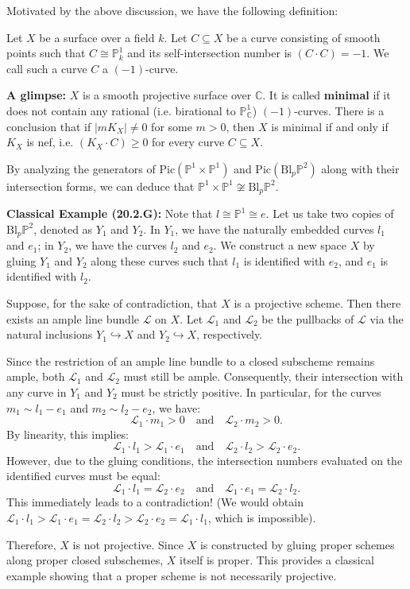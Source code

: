 Motivated by the above discussion, we have the following definition:

\begin{definition}[20.2.8]
Let $X$ be a surface over a field $k$. Let $C \subseteq X$ be a curve consisting of smooth points such that $C \cong \mathbb{P}^1_k$ and its self-intersection number is $(C \cdot C) = -1$. We call such a curve $C$ a $(-1)$-curve.
\end{definition}

\textbf{A glimpse:} $X$ is a smooth projective surface over $\mathbb{C}$. It is called \textbf{minimal} if it does not contain any rational (i.e. birational to $\mathbb{P}^1_{\mathbb{C}}$) $(-1)$-curves. 
There is a conclusion that if $|mK_X|\neq 0$ for some $m>0$, then $X$ is minimal if and only if $K_X$ is nef, i.e. $(K_X \cdot C) \geq 0$ for every curve $C \subseteq X$.

\begin{remark}
By analyzing the generators of $\mathrm{Pic}(\mathbb{P}^1 \times \mathbb{P}^1)$ and $\mathrm{Pic}(\mathrm{Bl}_p \mathbb{P}^2)$ along with their intersection forms, we can deduce that $\mathbb{P}^1 \times \mathbb{P}^1 \not\cong \mathrm{Bl}_p \mathbb{P}^2$.
\end{remark}



\textbf{Classical Example (20.2.G):}
Note that $l \cong \mathbb{P}^1 \cong e$. 
Let us take two copies of $\text{Bl}_p \mathbb{P}^2$, denoted as $Y_1$ and $Y_2$. In $Y_1$, we have the naturally embedded curves $l_1$ and $e_1$; in $Y_2$, we have the curves $l_2$ and $e_2$. We construct a new space $X$ by gluing $Y_1$ and $Y_2$ along these curves such that $l_1$ is identified with $e_2$, and $e_1$ is identified with $l_2$. 

Suppose, for the sake of contradiction, that $X$ is a projective scheme. Then there exists an ample line bundle $\mathcal{L}$ on $X$. Let $\mathcal{L}_1$ and $\mathcal{L}_2$ be the pullbacks of $\mathcal{L}$ via the natural inclusions $Y_1 \hookrightarrow X$ and $Y_2 \hookrightarrow X$, respectively. 

Since the restriction of an ample line bundle to a closed subscheme remains ample, both $\mathcal{L}_1$ and $\mathcal{L}_2$ must still be ample. Consequently, their intersection with any curve in $Y_1$ and $Y_2$ must be strictly positive. In particular, for the curves $m_1 \sim l_1 - e_1$ and $m_2 \sim l_2 - e_2$, we have:
\[
\mathcal{L}_1 \cdot m_1 > 0 \quad \text{and} \quad \mathcal{L}_2 \cdot m_2 > 0.
\]
By linearity, this implies:
\[
\mathcal{L}_1 \cdot l_1 > \mathcal{L}_1 \cdot e_1 \quad \text{and} \quad \mathcal{L}_2 \cdot l_2 > \mathcal{L}_2 \cdot e_2.
\]
However, due to the gluing conditions, the intersection numbers evaluated on the identified curves must be equal:
\[
\mathcal{L}_1 \cdot l_1 = \mathcal{L}_2 \cdot e_2 \quad \text{and} \quad \mathcal{L}_1 \cdot e_1 = \mathcal{L}_2 \cdot l_2.
\]
This immediately leads to a contradiction! (We would obtain $\mathcal{L}_1 \cdot l_1 > \mathcal{L}_1 \cdot e_1 = \mathcal{L}_2 \cdot l_2 > \mathcal{L}_2 \cdot e_2 = \mathcal{L}_1 \cdot l_1$, which is impossible). 

Therefore, $X$ is not projective. Since $X$ is constructed by gluing proper schemes along proper closed subschemes, $X$ itself is proper. This provides a classical example showing that a proper scheme is not necessarily projective.